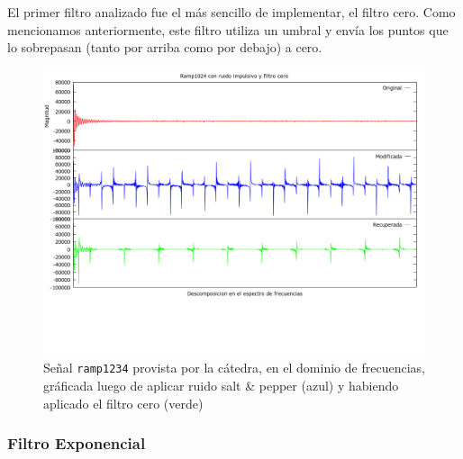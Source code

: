 El primer filtro analizado fue el m\'as sencillo de implementar, el filtro cero.
Como mencionamos anteriormente, este filtro utiliza un umbral y env\'ia los
puntos que lo sobrepasan (tanto por arriba como por debajo) a cero.

\begin{figure}[H]
\begin {center}
\includegraphics[width=500pt]{imagenes/ramp1234-imp-zero.png}
\end {center}
\caption{Se\~nal \texttt{ramp1234} provista por la c\'atedra, en el dominio de frecuencias, gr\'aficada
luego de aplicar ruido salt & pepper (azul) y habiendo aplicado el filtro cero (verde)}
\label{fig:Dopp1024zero}
\end{figure}


\subsubsection{Filtro Exponencial}



